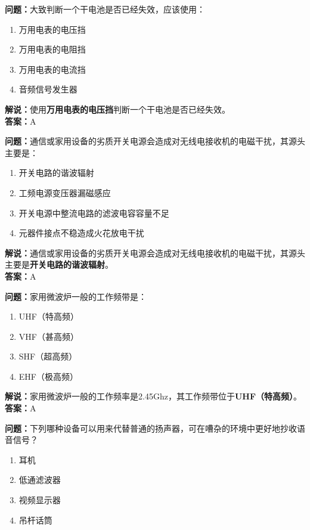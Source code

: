 \textbf{问题：}大致判断一个干电池是否已经失效，应该使用：

\begin{enumerate}[label=\Alph*), leftmargin=1cm]
	\item 万用电表的电压挡
	\item 万用电表的电阻挡
	\item 万用电表的电流挡
	\item 音频信号发生器
\end{enumerate}

\textbf{解说：}使用\textbf{万用电表的电压挡}判断一个干电池是否已经失效。\\\textbf{答案：}A%


\textbf{问题：}通信或家用设备的劣质开关电源会造成对无线电接收机的电磁干扰，其源头主要是：

\begin{enumerate}[label=\Alph*), leftmargin=1cm]
	\item 开关电路的谐波辐射
	\item 工频电源变压器漏磁感应
	\item 开关电源中整流电路的滤波电容容量不足
	\item 元器件接点不稳造成火花放电干扰
\end{enumerate}

\textbf{解说：}通信或家用设备的劣质开关电源会造成对无线电接收机的电磁干扰，其源头主要是\textbf{开关电路的谐波辐射}。\\\textbf{答案：}A%


\textbf{问题：}家用微波炉一般的工作频带是：

\begin{enumerate}[label=\Alph*), leftmargin=1cm]
	\item UHF（特高频）
	\item VHF（甚高频）
	\item SHF（超高频）
	\item EHF（极高频）
\end{enumerate}

\textbf{解说：}家用微波炉一般的工作频率是2.45Ghz，其工作频带位于\textbf{UHF（特高频）}。\\\textbf{答案：}A


\textbf{问题：}下列哪种设备可以用来代替普通的扬声器，可在嘈杂的环境中更好地抄收语音信号？

\begin{enumerate}[label=\Alph*), leftmargin=1cm]
	\item 耳机
	\item 低通滤波器
	\item 视频显示器
	\item 吊杆话筒
\end{enumerate}

